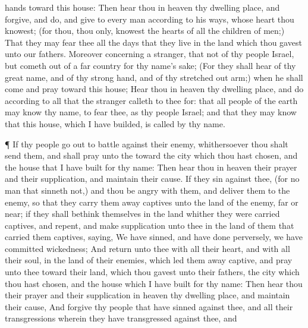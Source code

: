 {hands toward this
house:
Then
hear thou in
heaven thy
dwelling
place, and
forgive, and
do, and
give to every
man according to his
ways, whose
heart thou
knowest; (for thou,
{} thou only,
knowest the
hearts of all the
children of
men;)
That they may
fear thee all the
days that they
live
in the
land which thou
gavest unto our
fathers.
Moreover concerning a
stranger, that
{} not of thy
people
Israel, but cometh
out of a
far
country
for thy
name’s sake;
(For they shall
hear of thy
great
name, and of thy
strong
hand, and of thy stretched
out
arm;) when he shall
come and
pray toward this
house;
Hear thou in
heaven thy
dwelling
place, and
do according to all that the
stranger
calleth to thee for: that all
people of the
earth may
know thy
name, to
fear thee, as
{} thy
people
Israel; and that they may
know that this
house, which I have
builded, is
called by thy
name.
\par }{\PP {}¶ If thy
people go
out to
battle against their
enemy,
whithersoever thou shalt
send them, and shall
pray unto the
{}
toward the
city which thou hast
chosen, and
{} the
house that I have
built for thy
name:
Then
hear thou in
heaven their
prayer and their
supplication, and
maintain their
cause.
If they
sin against thee, (for
{} no
man that
sinneth not,) and thou be
angry with them, and
deliver them to the
enemy, so that they carry them
away
captives
unto the
land of the
enemy,
far or
near;
 if they shall
bethink themselves in the
land whither they were carried
captives, and
repent, and make
supplication unto thee in the
land of them that carried them
captives,
saying, We have
sinned, and have done
perversely, we have committed
wickedness;
And
{}
return unto thee with all their
heart, and with all their
soul, in the
land of their
enemies, which led them away
captive, and
pray unto thee
toward their
land, which thou
gavest unto their
fathers, the
city which thou hast
chosen, and the
house which I have
built for thy
name:
Then
hear thou their
prayer and their
supplication in
heaven thy
dwelling
place, and
maintain their
cause,
And
forgive thy
people that have
sinned against thee, and all their
transgressions wherein they have
transgressed against thee, and
}
